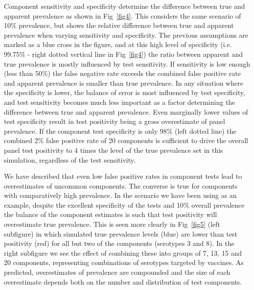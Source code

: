 \documentclass[10pt,letterpaper]{article}
\begin{document}
Component sensitivity and specificity determine the difference between true and apparent prevalence as shown in Fig~\ref{fig4}.  This considers the same scenario of 10\% prevalence, but shows the relative difference between true and apparent prevalence when varying sensitivity and specificity. The previous assumptions are marked as a blue cross in the figure, and at this high level of specificity (i.e. 99.75\% - right dotted vertical line in Fig~\ref{fig4}) the ratio between apparent and true prevalence is mostly influenced by test sensitivity. If sensitivity is low enough (less than 50\%) the false negative rate exceeds the combined false positive rate and apparent prevalence is smaller than true prevalence. In any situation where the specificity is lower, the balance of error is most influenced by test specificity, and test sensitivity becomes much less important as a factor determining the difference between true and apparent prevalence. Even marginally lower values of test specificity result in test positivity being a gross overestimate of panel prevalence. If the component test specificity is only 98\% (left dotted line) the combined 2\% false positive rate of 20 components is sufficient to drive the overall panel test positivity to 4 times the level of the true prevalence set in this simulation, regardless of the test sensitivity.

We have described that even low false positive rates in component tests lead to overestimates of uncommon components. The converse is true for components with comparatively high prevalence. In the scenario we have been using as an example, despite the excellent specificity of the tests and 10\% overall prevalence the balance of the component estimates is such that test positivity will overestimate true prevalence. This is seen more clearly in Fig~\ref{fig5} (left subfigure) in which simulated true prevalence levels (blue) are lower than test positivity (red) for all but two of the components (serotypes 3 and 8). In the right subfigure we see the effect of combining these into groups of 7, 13, 15 and 20 components, representing combinations of serotypes targeted by vaccines. As predicted, overestimates of prevalence are compounded and the size of each overestimate depends both on the number and distribution of test components.
\end{document}

